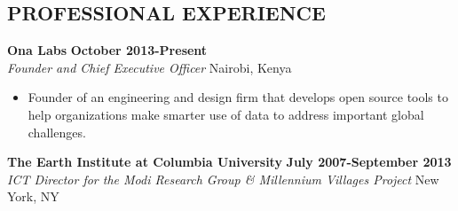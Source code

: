\documentclass{res}
\begin{document}
\thispagestyle{empty} %

\address{ 748 Tende Drive \\   Nairobi, Kenya \\ +254.725.640.695}      
                                      
\address{mlberg@gmail.com}

\begin{resume}
 
\section{PROFESSIONAL EXPERIENCE} 

\vspace{8pt}
\textbf{Ona Labs} \hfill        \textbf{October 2013-Present} \\
\emph{Founder and Chief Executive Officer}       \hfill   Nairobi, Kenya

\begin{itemize} \itemsep -2pt %
	\item Founder of an engineering and design firm that develops open source tools to help organizations make smarter use of data to address important global challenges.

 \end{itemize} \vspace{-4pt}

\vspace{8pt}
\textbf{The Earth Institute at Columbia University} \hfill        \textbf{July 2007-September 2013} \\
\emph{ICT Director for the Modi Research Group \& Millennium Villages Project}       \hfill   New York, NY


\end{resume}
\end{document}

